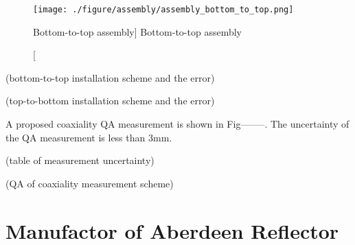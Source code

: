 \begin{figure}
    \centering
    \texttt{[image: ./figure/assembly/assembly\_bottom\_to\_top.png]}
    \caption
    [Bottom-to-top assembly]
    {Bottom-to-top assembly}
    \label{fig:assembly_bottom_to_top.png}
    \end{figure}









(bottom-to-top installation scheme and the error)




(top-to-bottom installation scheme and the error)



A proposed coaxiality QA measurement is shown in Fig--------. The uncertainty
of the QA measurement is less than 3mm.


(table of measurement uncertainty)





(QA of coaxiality measurement scheme)







\section {Manufactor of Aberdeen Reflector}
\label{sec:reflector}
